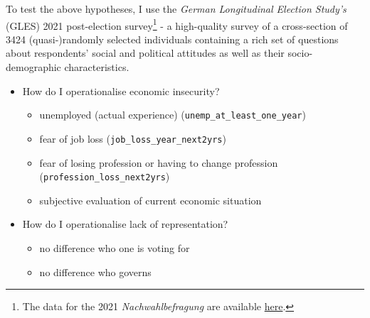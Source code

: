 \documentclass[
]{article}
\providecommand{\tightlist}{%
  \setlength{\itemsep}{0pt}\setlength{\parskip}{0pt}}
\begin{document}
To test the above hypotheses, I use the \emph{German Longitudinal
Election Study's} (GLES) 2021 post-election survey\footnote{The data for
  the 2021 \emph{Nachwahlbefragung} are available
  \href{https://search.gesis.org/research_data/ZA7701}{here}.} - a
high-quality survey of a cross-section of 3424 (quasi-)randomly selected
individuals containing a rich set of questions about respondents' social
and political attitudes as well as their socio-demographic
characteristics.

\begin{itemize}
\tightlist
\item
  How do I operationalise economic insecurity?

  \begin{itemize}
  \tightlist
  \item
    unemployed (actual experience)
    (\texttt{unemp\_at\_least\_one\_year})
  \item
    fear of job loss (\texttt{job\_loss\_year\_next2yrs})
  \item
    fear of losing profession or having to change profession
    (\texttt{profession\_loss\_next2yrs})
  \item
    subjective evaluation of current economic situation
  \end{itemize}
\item
  How do I operationalise lack of representation?

  \begin{itemize}
  \tightlist
  \item
    no difference who one is voting for
  \item
    no difference who governs
  \end{itemize}
\end{itemize}
\end{document}

